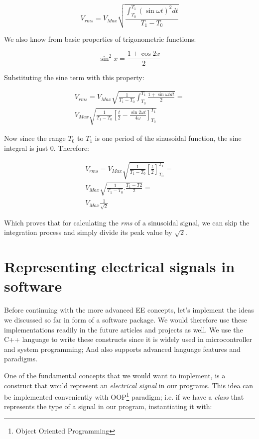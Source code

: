 \documentclass{article}
\begin{document}
	$$V_{rms} = V_{Max} \sqrt{\frac{\int_{T_0}^{T_1} (\sin \omega t) ^ 2 dt }{T_1 - T_0}}$$
	
	We also know from basic properties of trigonometric functions:
	
	$$ \sin^2 x = \frac{1 + \cos 2x}{2} $$
	
	Substituting the sine term with this property:
	
	\begin{align} 
	V_{rms} = V_{Max} \sqrt{\frac{1}{{T_1 - T_0}}{\int_{T_0}^{T_1} \frac{1 + \sin \omega t dt}{2}}} = \\
	 V_{Max} \sqrt{\frac{1}{T_1 - T_0} \left[ \frac{t}{2} - \frac{\sin 2 \omega t}{4 \omega}\right]_{T_0}^{T_1} }
	\end{align}
	
	Now since the range $T_0$ to $T_1$ is one period of the sinusoidal function, the sine integral is just $0$. Therefore:
		
	\begin{equation}
	\begin{gathered}
	V_{rms} = V_{Max} \sqrt{\frac{1}{T_1 - T_0} \left[ \frac{t}{2} \right]_{T_0}^{T_1}} = \\
	V_{Max}\sqrt{\frac{1}{T_1 - T_0} . \frac{T_1 - T2}{2}} = \\
 V_{Max} \frac{1}{\sqrt{2}}
	\end{gathered}
	\end{equation}

	Which proves that for calculating the \textit{rms} of a sinusoidal signal, we can skip the integration process and simply divide its peak value by $\sqrt{2}$.

	
	\section{Representing electrical signals in software}
	Before continuing with the more advanced EE concepts, let's implement the ideas we discussed so far in form of a software package.
	We would therefore use these implementations readily in the future articles and projects as well.
	We use the C++ language to write these constructs since it is widely used in microcontroller and system programming; And also supports advanced language features and paradigms.
	
	One of the fundamental concepts that we would want to implement, is a construct that would represent an \textit{electrical signal} in our programs.
	This idea can be implemented conveniently with OOP\footnote[1]{Object Oriented Programming} paradigm; i.e. if we have a \textit{class} that represents the type of a signal in our program, instantiating it with:
	
\end{document}
